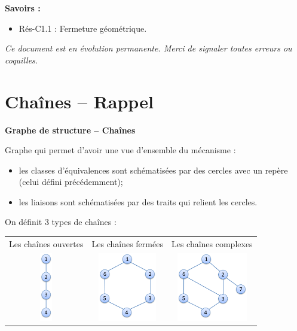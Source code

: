 \documentclass[10pt,oneside]{article}
\begin{document}
\begin{savoir}
\textbf{Savoirs :}
\begin{itemize}
\item Rés-C1.1 : Fermeture géométrique.
\end{itemize}
\end{savoir}

\setlength{\parskip}{0ex plus 0.2ex minus 0ex}
 \renewcommand{\contentsname}{}
 \renewcommand{\baselinestretch}{1}



\textit{Ce document est en évolution permanente. Merci de signaler toutes erreurs ou coquilles.}
\tableofcontents

 \renewcommand{\baselinestretch}{1.2}
\setlength{\parskip}{2ex plus 0.5ex minus 0.2ex}



\section{Chaînes -- Rappel}
\begin{defi}
\textbf{Graphe de structure -- Chaînes}

Graphe qui permet d'avoir une vue d'ensemble du mécanisme :
\begin{itemize}
\item les classes d'équivalences sont schématisées par des cercles avec un repère (celui défini précédemment);
\item les liaisons sont schématisées par des traits qui relient les cercles.
\end{itemize}

On définit 3 types de chaînes :
\begin{center}
\begin{tabular}{ccc}
Les chaînes ouvertes & Les chaînes fermées & Les chaînes complexes \\
\includegraphics[height=3cm]{png/co.png}
&
\includegraphics[height=3cm]{png/cf.png}
&
\includegraphics[height=3cm]{png/cc.png}\\
\end{tabular}
\end{center}
\end{defi}
\end{document}
